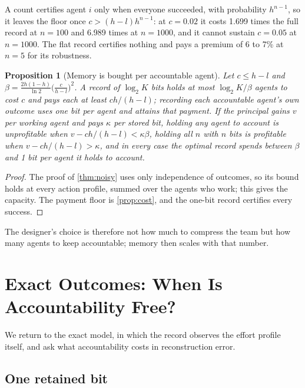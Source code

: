 \documentclass[sigconf,anonymous,acmthm=false]{acmart}
\theoremstyle{acmplain}
\newtheorem{proposition}{Proposition}
\theoremstyle{acmdefinition}
\begin{document}
A count certifies agent $i$ only when everyone succeeded, with probability $h^{n-1}$, so it
leaves the floor once $c>(h-l)h^{n-1}$: at $c=0.02$ it costs 1.699 times the full record at
$n=100$ and 6.989 times at $n=1000$, and it cannot sustain $c=0.05$ at $n=1000$. The flat
record certifies nothing and pays a premium of 6 to 7\% at $n=5$ for its robustness.

\begin{proposition}[Memory is bought per accountable agent]\label{prop:designer}
Let $c\le h-l$ and $\beta=\frac{2h(1-h)}{\ln2}\big(\frac c{h-l}\big)^2$. A record of $\log_2K$
bits holds at most $\log_2K/\beta$ agents to cost $c$ and pays each at least $ch/(h-l)$;
recording each accountable agent's own outcome uses one bit per agent and attains that
payment. If the principal gains $v$ per working agent and pays $\kappa$ per stored bit,
holding any agent to account is unprofitable when $v-ch/(h-l)<\kappa\beta$, holding all $n$
with $n$ bits is profitable when $v-ch/(h-l)>\kappa$, and in every case the optimal record
spends between $\beta$ and 1 bit per agent it holds to account.
\end{proposition}
\begin{proof}
The proof of \cref{thm:noisy} uses only independence of outcomes, so its bound holds at every
action profile, summed over the agents who work; this gives the capacity. The payment floor
is \cref{prop:cost}, and the one-bit record certifies every success.
\end{proof}

The designer's choice is therefore not how much to compress the team but how many agents to
keep accountable; memory then scales with that number.

\section{Exact Outcomes: When Is Accountability Free?}\label{sec:exact}

We return to the exact model, in which the record observes the effort profile itself, and
ask what accountability costs in reconstruction error.

\subsection{One retained bit}\label{sec:onebit}
\end{document}
